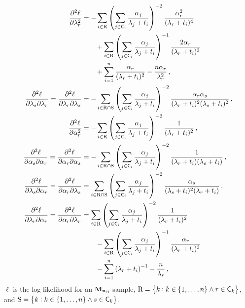 \documentclass[
    11pt,
    extrafontsizes,
    article,
    oldfontcommands,
    final,
    oneside,
    openany,
    hidelinks]{memoir}
\begin{document}
\begin{align}
    \frac{\partial^2 \ell} {\partial \lambda_r^2} &=
        - \sum_{i \in \mathrm{R}}
        \left (
            \sum_{j \in \cand_i} \frac{\alpha_j}{\lambda_j + t_i} 
        \right )^{-2}
        \frac{\alpha_r^2}{(\lambda_r+t_i)^4}\\&\qquad+
        \sum_{i \in \mathrm{R}}
        \left (
            \sum_{j \in \cand_i} \frac{\alpha_j}{\lambda_j + t_i} 
        \right )^{-1}
        \frac{2 \alpha_r}{(\lambda_r+t_i)^3}\\&\qquad+
        \sum_{i=1}^{n} \frac{\alpha_r}{(\lambda_r + t_i)^2} -
        \frac{n \alpha_r}{\lambda_r^2}\,,\\
    \frac{\partial^2 \ell} {\partial \lambda_s \partial \lambda_r} =
        \frac{\partial^2 \ell} {\partial \lambda_r \partial \lambda_s} &=
        -\sum_{i \in \mathrm{R} \cap \mathrm{S}} \left (
        \sum_{j \in \cand_i} \frac{\alpha_j}{\lambda_j + t_i} \right )^{-2}
        \frac{\alpha_r \alpha_s}{(\lambda_r + t_i)^2 (\lambda_s + t_i)^2}\,,\\
    \frac{\partial^2 \ell} {\partial \alpha_r^2} &=
        -\sum_{i \in \mathrm{R}} \left ( \sum_{j \in \cand_i}
        \frac{\alpha_j}{\lambda_j + t_i} \right )^{-2} \frac{1}{(\lambda_r + t_i)^2}\,,\\
    \frac{\partial^2 \ell} {\partial \alpha_s \partial \alpha_r} = \frac{\partial^2 \ell} {\partial \alpha_r \partial \alpha_s} &=
        -\sum_{i \in \mathrm{R} \cap \mathrm{S}} \left ( \sum_{j \in \cand_i}
        \frac{\alpha_j}{\lambda_j + t_i} \right )^{-2} \frac{1}{(\lambda_r + t_i)(\lambda_s + t_i)}\,,\\
    \frac{\partial^2 \ell} {\partial \lambda_s \partial \alpha_r} = \frac{\partial^2 \ell} {\partial \alpha_r \partial \lambda_s} &=
        \sum_{i \in \mathrm{R} \cap \mathrm{S}}
        \left (
            \sum_{j \in \cand_i} \frac{\alpha_j}{\lambda_j + t_i}
        \right )^{-2}
        \frac{\alpha_s}{(\lambda_s + t_i)^2 (\lambda_r + t_i)}\,,\\
    \frac{\partial^2 \ell} {\partial \lambda_r \partial \alpha_r} = \frac{\partial^2 \ell} {\partial \alpha_r \partial \lambda_r} &=
        \sum_{i \in \mathrm{R}}
        \left (
            \sum_{j \in \cand_i} \frac{\alpha_j}{\lambda_j + t_i}
        \right )^{-2}
        \frac{1}{(\lambda_r + t_i)^2}\\&\qquad-
        \sum_{i \in \mathrm{R}}
        \left (
            \sum_{j \in \cand_i} \frac{\alpha_j}{\lambda_j + t_i}
        \right )^{-1}
        \frac{\alpha_r}{(\lambda_r + t_i)^3}\\&\qquad-
        \sum_{i=1}^{n}
        \left (
            {\lambda_r + t_i}
        \right )^{-1} -
        \frac{n}{\lambda_r}\,,
\end{align}
$\ell$ is the log-likelihood for an $\boldsymbol{\mathbf{M_n}}_n$ sample, $\mathrm{R} = \left \{ k : k \in \{1, \ldots, n \} \wedge r \in \cand_k \right \}$, and $\mathrm{S} = \left \{ k : k \in \{1, \ldots, n \} \wedge s \in \cand_k \right \}$.
\end{document}
